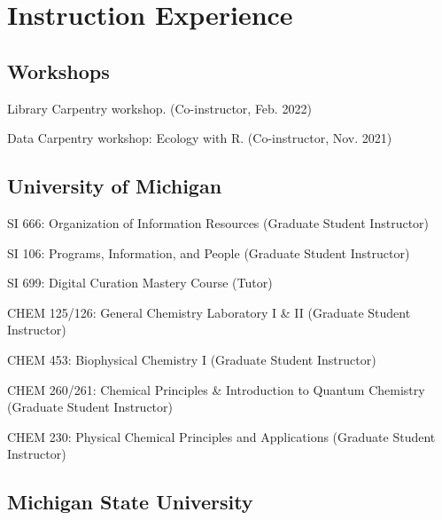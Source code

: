 \documentclass[12pt,letterpaper]{report}
\newcommand{\listitemspace}{0.25em}
\renewenvironment{itemize}
{\begin{list}{}{\setlength{\leftmargin}{0em}
            \setlength{\parskip}{0em}
            \setlength{\itemsep}{\listitemspace}
            \setlength{\parsep}{\listitemspace}}}
{\end{list}}
\begin{document}
\section*{Instruction Experience}

\subsection*{Workshops}

\begin{itemize}

	\item Library Carpentry workshop. (Co-instructor, Feb. 2022)
	
	\item Data Carpentry workshop: Ecology with R. (Co-instructor, Nov. 2021)

\end{itemize}

\subsection*{University of Michigan}
    
\begin{itemize}
    	
    	\item SI 666: Organization of Information Resources (Graduate Student Instructor)
        
	\item SI 106: Programs, Information, and People (Graduate Student Instructor)
        
	\item SI 699: Digital Curation Mastery Course (Tutor)
        
	\item CHEM 125/126: General Chemistry Laboratory I \& II (Graduate Student Instructor)
        
	\item CHEM 453: Biophysical Chemistry I (Graduate Student Instructor)
        
	\item CHEM 260/261: Chemical Principles \& Introduction to Quantum Chemistry (Graduate Student Instructor)
        
	\item CHEM 230: Physical Chemical Principles and Applications (Graduate Student Instructor)
    
\end{itemize}
    	
\subsection*{Michigan State University}
\end{document}
